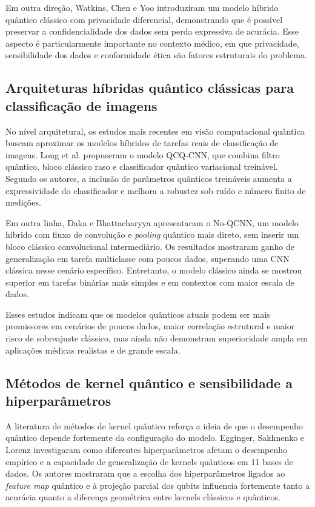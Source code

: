 Em outra direção, Watkins, Chen e Yoo \cite{watkins2023} introduziram um modelo híbrido quântico clássico com privacidade diferencial, demonstrando que é possível preservar a confidencialidade dos dados sem perda expressiva de acurácia. Esse aspecto é particularmente importante no contexto médico, em que privacidade, sensibilidade dos dados e conformidade ética são fatores estruturais do problema.

\subsection{Arquiteturas híbridas quântico clássicas para classificação de imagens}

No nível arquitetural, os estudos mais recentes em visão computacional quântica buscam aproximar os modelos híbridos de tarefas reais de classificação de imagens. Long et al. \cite{long2025} propuseram o modelo QCQ-CNN, que combina filtro quântico, bloco clássico raso e classificador quântico variacional treinável. Segundo os autores, a inclusão de parâmetros quânticos treináveis aumenta a expressividade do classificador e melhora a robustez sob ruído e número finito de medições.

Em outra linha, Daka e Bhattacharyya \cite{daka2026} apresentaram o No-QCNN, um modelo híbrido com fluxo de convolução e \textit{pooling} quântico mais direto, sem inserir um bloco clássico convolucional intermediário. Os resultados mostraram ganho de generalização em tarefa multiclasse com poucos dados, superando uma CNN clássica nesse cenário específico. Entretanto, o modelo clássico ainda se mostrou superior em tarefas binárias mais simples e em contextos com maior escala de dados.

Esses estudos indicam que os modelos quânticos atuais podem ser mais promissores em cenários de poucos dados, maior correlação estrutural e maior risco de sobreajuste clássico, mas ainda não demonstram superioridade ampla em aplicações médicas realistas e de grande escala.

\subsection{Métodos de kernel quântico e sensibilidade a hiperparâmetros}

A literatura de métodos de kernel quântico reforça a ideia de que o desempenho quântico depende fortemente da configuração do modelo. Egginger, Sakhnenko e Lorenz \cite{egginger2024} investigaram como diferentes hiperparâmetros afetam o desempenho empírico e a capacidade de generalização de kernels quânticos em 11 bases de dados. Os autores mostraram que a escolha dos hiperparâmetros ligados ao \textit{feature map} quântico e à projeção parcial dos qubits influencia fortemente tanto a acurácia quanto a diferença geométrica entre kernels clássicos e quânticos.

